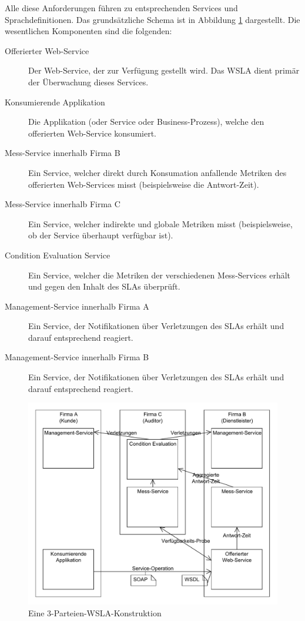 \documentclass[11pt,listof=totoc]{scrreprt} %
\theoremstyle{definition}
\begin{document}
Alle diese Anforderungen führen zu entsprechenden Services und Sprachdefinitionen. Das grundsätzliche Schema ist in Abbildung \ref{wslaone} dargestellt. Die wesentlichen Komponenten sind die folgenden:

\begin{description}
\item[Offerierter Web-Service] Der Web-Service, der zur Verfügung gestellt wird. Das WSLA dient primär der Überwachung dieses Services.
\item[Konsumierende Applikation] Die Applikation (oder Service oder Business-Prozess), welche den offerierten Web-Service konsumiert.
\item[Mess-Service innerhalb Firma B] Ein Service, welcher direkt durch Konsumation anfallende Metriken des offerierten Web-Services misst (beispielsweise die Antwort-Zeit).
\item[Mess-Service innerhalb Firma C] Ein Service, welcher indirekte und globale Metriken misst (beispielsweise, ob der Service überhaupt verfügbar ist).
\item[Condition Evaluation Service] Ein Service, welcher die Metriken der verschiedenen Mess-Services erhält und gegen den Inhalt des SLAs überprüft.
\item[Management-Service innerhalb Firma A] Ein Service, der Notifikationen über Verletzungen des SLAs erhält und darauf entsprechend reagiert.
\item[Management-Service innerhalb Firma B] Ein Service, der Notifikationen über Verletzungen des SLAs erhält und darauf entsprechend reagiert.
\end{description}

\begin{figure}
\caption{Eine 3-Parteien-WSLA-Konstruktion}
\label{wslaone}
\includegraphics[scale=0.7]{diagramme/wsla_basic.pdf}
\end{figure}
\end{document}
